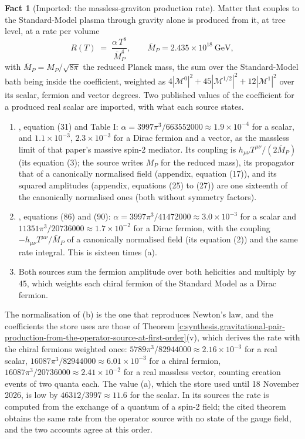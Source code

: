 \documentclass[11pt]{article}
\theoremstyle{definition}
\newtheorem{fact}[theorem]{Fact}
\theoremstyle{plain}
\newcommand{\changedmark}[2]{\marginpar{\raggedright\scriptsize\color{#1}#2}}
\begin{document}
\begin{fact}[Imported: the massless-graviton production rate]\label{c:dark-matter.imported-massless-graviton-production-rate}
\changedmark{BurntOrange}{changed since the deposit}
Matter that couples to the Standard-Model plasma through gravity alone is produced from it, at tree level, at a rate per volume
\[
R(T) \;=\; \frac{\alpha\,T^{8}}{\bar{M}_{P}^{4}}, \qquad \bar{M}_{P} = 2.435 \times 10^{18}\ \mathrm{GeV},
\]
with $\bar{M}_{P} = M_{P}/\sqrt{8\pi}$ the reduced Planck mass, the sum over the Standard-Model bath being inside the coefficient, weighted as $4|\mathcal{M}^{0}|^{2} + 45|\mathcal{M}^{1/2}|^{2} + 12|\mathcal{M}^{1}|^{2}$ over its scalar, fermion and vector degrees. Two published values of the coefficient for a produced real scalar are imported, with what each source states.
\begin{enumerate}
\item[(a)] \cite{Bernal2018}, equation (31) and Table I: $\alpha = 3997\pi^{3}/663552000 \approx 1.9 \times 10^{-4}$ for a scalar, and $1.1 \times 10^{-3}$, $2.3 \times 10^{-3}$ for a Dirac fermion and a vector, as the massless limit of that paper's massive spin-2 mediator. Its coupling is $h_{\mu\nu}T^{\mu\nu}/(2\bar{M}_{P})$ (its equation (3); the source writes $M_{P}$ for the reduced mass), its propagator that of a canonically normalised field (appendix, equation (17)), and its squared amplitudes (appendix, equations (25) to (27)) are one sixteenth of the canonically normalised ones (both without symmetry factors).
\item[(b)] \cite{CleryEtAl2022}, equations (86) and (90): $\alpha = 3997\pi^{3}/41472000 \approx 3.0 \times 10^{-3}$ for a scalar and $11351\pi^{3}/20736000 \approx 1.7 \times 10^{-2}$ for a Dirac fermion, with the coupling $-h_{\mu\nu}T^{\mu\nu}/\bar{M}_{P}$ of a canonically normalised field (its equation (2)) and the same rate integral. This is sixteen times (a).
\item[(c)] Both sources sum the fermion amplitude over both helicities and multiply by $45$, which weights each chiral fermion of the Standard Model as a Dirac fermion.
\end{enumerate}
The normalisation of (b) is the one that reproduces Newton's law, and the coefficients the store uses are those of Theorem \ref{c:synthesis.gravitational-pair-production-from-the-operator-source-at-first-order}(v), which derives the rate with the chiral fermions weighted once: $5789\pi^{3}/82944000 \approx 2.16 \times 10^{-3}$ for a real scalar, $16087\pi^{3}/82944000 \approx 6.01 \times 10^{-3}$ for a chiral fermion, $16087\pi^{3}/20736000 \approx 2.41 \times 10^{-2}$ for a real massless vector, counting creation events of two quanta each. The value (a), which the store used until 18 November 2026, is low by $46312/3997 \approx 11.6$ for the scalar. In its sources the rate is computed from the exchange of a quantum of a spin-2 field; the cited theorem obtains the same rate from the operator source with no state of the gauge field, and the two accounts agree at this order.

\end{fact}
\end{document}
